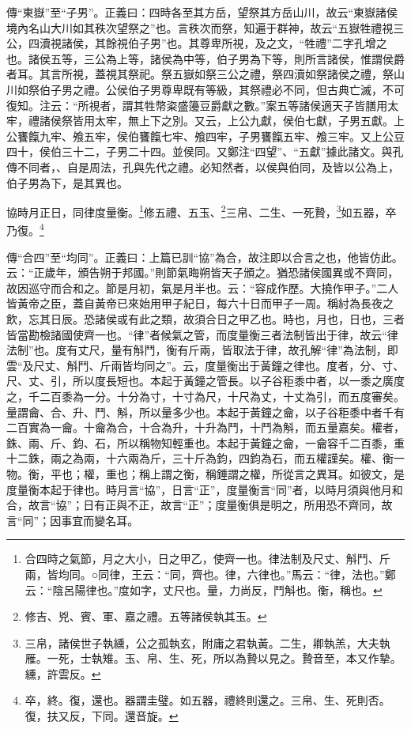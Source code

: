 {\noindent\zhuan{}\fzbyks 傳“東嶽”至“子男”。正義曰：四時各至其方岳，望祭其方岳山川，故云“東嶽諸侯境內名山大川如其秩次望祭之”也。言秩次而祭，知遍于群神，故云“五嶽牲禮視三公，四瀆視諸侯，其餘視伯子男”也。其尊卑所視，及之文，“牲禮”二字孔增之也。諸侯五等，三公為上等，諸侯為中等，伯子男為下等，則所言諸侯，惟謂侯爵者耳。其言所視，蓋視其祭祀。祭五嶽如祭三公之禮，祭四瀆如祭諸侯之禮，祭山川如祭伯子男之禮。公侯伯子男尊卑既有等級，其祭禮必不同，但古典亡滅，不可復知。注云：“所視者，謂其牲幣粢盛籩豆爵獻之數。”案五等諸侯適天子皆膳用太牢，禮諸侯祭皆用太牢，無上下之別。又云，上公九獻，侯伯七獻，子男五獻。上公饔餼九牢、飧五牢，侯伯饔餼七牢、飧四牢，子男饔餼五牢、飧三牢。又上公豆四十，侯伯三十二，子男二十四。並侯同。又鄭注“四望”、“五獻”據此諸文。與孔傳不同者，、自是周法，孔與先代之禮。必知然者，以侯與伯同，及皆以公為上，伯子男為下，是其異也。 \par}

協時月正日，同律度量衡。\footnote{合四時之氣節，月之大小，日之甲乙，使齊一也。律法制及尺丈、斛鬥、斤兩，皆均同。○同律，王云：“同，齊也。律，六律也。”馬云：“律，法也。”鄭云：“陰呂陽律也。”度如字，丈尺也。量，力尚反，鬥斛也。衡，稱也。}修五禮、五玉、\footnote{修吉、兇、賓、軍、嘉之禮。五等諸侯執其玉。}三帛、二生、一死贄，\footnote{三帛，諸侯世子執纁，公之孤執玄，附庸之君執黃。二生，卿執羔，大夫執雁。一死，士執雉。玉、帛、生、死，所以為贄以見之。贄音至，本又作摯。纁，許雲反。}如五器，卒乃復。\footnote{卒，終。復，還也。器謂圭璧。如五器，禮終則還之。三帛、生、死則否。復，扶又反，下同。還音旋。}

{\noindent\zhuan{}\fzbyks 傳“合四”至“均同”。正義曰：上篇已訓“協”為合，故注即以合言之也，他皆仿此。云：“正歲年，頒告朔于邦國。”則節氣晦朔皆天子頒之。猶恐諸侯國異或不齊同，故因巡守而合和之。節是月初，氣是月半也。云：“容成作歷。大撓作甲子。”二人皆黃帝之臣，蓋自黃帝已來始用甲子紀日，每六十日而甲子一周。稱紂為長夜之飲，忘其日辰。恐諸侯或有此之類，故須合日之甲乙也。時也，月也，日也，三者皆當勘檢諸國使齊一也。“律”者候氣之管，而度量衡三者法制皆出于律，故云“律法制”也。度有丈尺，量有斛鬥，衡有斤兩，皆取法于律，故孔解“律”為法制，即雲“及尺丈、斛鬥、斤兩皆均同之”。云，度量衡出于黃鐘之律也。度者，分、寸、尺、丈、引，所以度長短也。本起于黃鐘之管長。以子谷秬黍中者，以一黍之廣度之，千二百黍為一分。十分為寸，十寸為尺，十尺為丈，十丈為引，而五度審矣。量謂龠、合、升、鬥、斛，所以量多少也。本起于黃鐘之龠，以子谷秬黍中者千有二百實為一龠。十龠為合，十合為升，十升為鬥，十鬥為斛，而五量嘉矣。權者，銖、兩、斤、鈞、石，所以稱物知輕重也。本起于黃鐘之龠，一龠容千二百黍，重十二銖，兩之為兩，十六兩為斤，三十斤為鈞，四鈞為石，而五權謹矣。權、衡一物。衡，平也；權，重也；稱上謂之衡，稱錘謂之權，所從言之異耳。如彼文，是度量衡本起于律也。時月言“協”，日言“正”，度量衡言“同”者，以時月須與他月和合，故言“協”；日有正與不正，故言“正”；度量衡俱是明之，所用恐不齊同，故言“同”；因事宜而變名耳。 \par}

